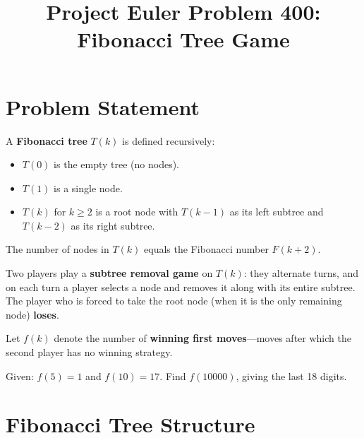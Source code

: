 \documentclass[11pt,a4paper]{article}
\title{Project Euler Problem 400:\\Fibonacci Tree Game}
\author{}
\date{}
\begin{document}
\maketitle

\section{Problem Statement}

A \textbf{Fibonacci tree} $T(k)$ is defined recursively:
\begin{itemize}
    \item $T(0)$ is the empty tree (no nodes).
    \item $T(1)$ is a single node.
    \item $T(k)$ for $k \geq 2$ is a root node with $T(k{-}1)$ as its left subtree and $T(k{-}2)$ as its right subtree.
\end{itemize}

The number of nodes in $T(k)$ equals the Fibonacci number $F(k{+}2)$.

Two players play a \textbf{subtree removal game} on $T(k)$: they alternate turns, and on each turn a player selects a node and removes it along with its entire subtree. The player who is forced to take the root node (when it is the only remaining node) \textbf{loses}.

Let $f(k)$ denote the number of \textbf{winning first moves}---moves after which the second player has no winning strategy.

\medskip\noindent
Given: $f(5) = 1$ and $f(10) = 17$. Find $f(10000)$, giving the last 18 digits.

\section{Fibonacci Tree Structure}

\begin{center}
\end{center}
\end{document}

